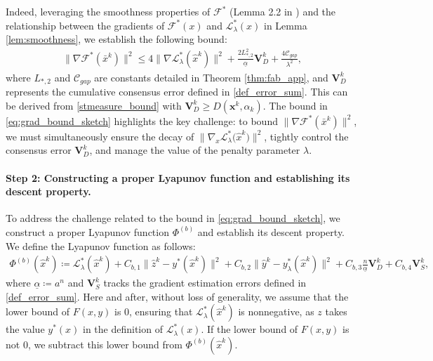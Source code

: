 \documentclass{article}
\theoremstyle{plain}
\theoremstyle{definition}
\theoremstyle{remark}
\begin{document}
Indeed, leveraging the smoothness properties of $\mathcal{F}^{*}$ (Lemma 2.2 in \citet{ghadimi2018bl}) and the relationship between the gradients of $\mathcal{F}^{*}(x)$ and $\mathcal{L}_{\lambda}^{*}(x)$ in Lemma \ref{lem:smoothness}, we establish the following bound: 
\begin{align}\label{eq:grad_bound_sketch}
     \|\nabla \mathcal{F}^*(\bar{x}^k)\|^{2}  \leq  4\big\|\nabla \mathcal{L}_{\lambda}^*({\hat{x}}^k)\|^{2}  + \frac{2 L_{*,2}^{2}}{\underline{\alpha}}  \mathbf{V}_{D}^{k}+\frac{4\mathcal{C}_{gap}}{\lambda^{2}},
\end{align}
where $L_{*,2}$ and $\mathcal{C}_{gap}$ are constants detailed in Theorem \ref{thm:fab_app}, and $\mathbf{V}_{D}^{k}$ represents the cumulative consensus error defined in \eqref{def_error_sum}. 
This can be derived from \eqref{stmeasure_bound} with $\mathbf{V}_{D}^{k}\geq D(\mathbf{x}^{k},\alpha_{k})$.
The bound in \eqref{eq:grad_bound_sketch} highlights the key challenge: to bound $\|\nabla \mathcal{F}^*(\bar{x}^k)\|^{2}$, we must simultaneously ensure the decay of $\|\nabla_{x} \mathcal{L}_{\lambda}^{*}\big({\hat{x}}^k\big)\|^2$, tightly control the consensus error $\mathbf{V}_D^{k}$, and manage the value of the penalty parameter $\lambda$.

\paragraph{Step 2: Constructing a proper Lyapunov function and establishing its descent property.}
To address the challenge related to the bound in \eqref{eq:grad_bound_sketch}, we construct a proper Lyapunov function $\Phi^{(b)}$ and establish its descent property.
We define the Lyapunov function as follows: 
\begin{align}\label{eq:lyap_def_sketch}
    \Phi^{(b)}({\hat{x}}^k) \coloneqq \mathcal{L}_{\lambda}^*({\hat{x}}^k) 
    + C_{b,1} \|{\hat{z}}^k-y^*({\hat{x}}^k)\|^2 + C_{b,2} \|{\hat{y}}^k-y_\lambda^*({\hat{x}}^k)\|^2  
    + C_{b,3} \frac{n}{\underline{\alpha}}\mathbf{V}_{D}^{k} + C_{b,4} \mathbf{V}_{S}^{k},
\end{align}
where $\underline{\alpha} \coloneqq a^n$ and $\mathbf{V}_{S}^{k}$ tracks the gradient estimation errors defined in \eqref{def_error_sum}. 
Here and after, without loss of generality, we assume that the lower bound of $F(x,y)$ is $0$, ensuring that $\mathcal{L}_{\lambda}^*({\hat{x}}^k)$ is nonnegative, as $z$ takes the value $y^*(x)$ in the definition of $\mathcal{L}_{\lambda}^*(x)$. If the lower bound of $F(x,y)$ is not $0$, we subtract this lower bound from $\Phi^{(b)}({\hat{x}}^k)$. 
\end{document}
